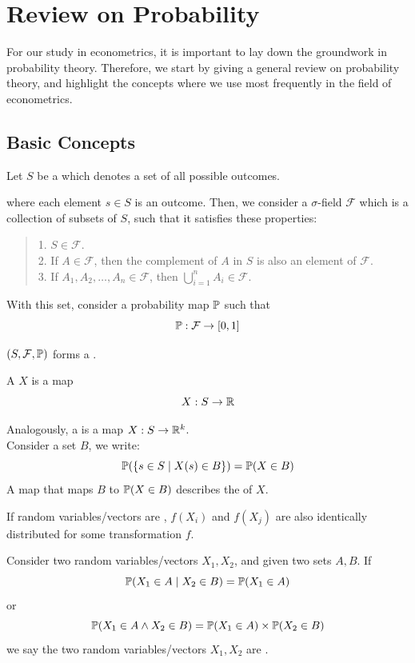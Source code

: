 \section{Review on Probability}
For our study in econometrics, it is important to lay down the groundwork in probability theory. Therefore, we start by giving a general review on probability theory, and highlight the concepts where we use most frequently in the field of econometrics.

\subsection{Basic Concepts}
\begin{definition}
    Let $S$ be a  which denotes a set of all possible outcomes.
\end{definition}
where each element $s \in S$ is an outcome. Then, we consider a $\sigma$-field $\mathcal{F}$ which is a collection of subsets of $S$, such that it satisfies these properties:
\begin{quote}
    1. $S \in \mathcal{F}$. \\
    2. If $A \in \mathcal{F}$, then the complement of $A$ in $S$ is also an element of $\mathcal{F}$. \\
    3. If $A_1, A_2, \dots, A_n \in \mathcal{F}$, then $\bigcup_{i = 1}^n A_i \in \mathcal{F}$.
\end{quote}
With this set, consider a probability map $\mathbb{P}$ such that
$$\mathbb{P}: \mathcal{F} \to [0, 1]$$
\begin{definition}
    $(S, \mathcal{F}, \mathbb{P})$ forms a .
\end{definition}
\begin{definition}
    A  $X$ is a map
    $$X: S \to \mathbb{R}$$
\end{definition}
Analogously, a  is a map $X: S \to \mathbb{R}^k$. \\
Consider a set $B$, we write:
$$\mathbb{P}(\{s \in S \mid X(s) \in B\}) = \mathbb{P}(X \in B)$$
A map that maps $B$ to $\mathbb{P}(X \in B)$ describes the  of $X$.
\begin{proposition}
    If random variables/vectors are , $f(X_i)$ and $f(X_j)$ are also identically distributed for some transformation $f$.
\end{proposition}
\begin{definition}
    Consider two random variables/vectors $X_1, X_2$, and given two sets $A, B$. If
    $$\mathbb{P}(X_1 \in A \mid X_2 \in B) = \mathbb{P}(X_1 \in A)$$
    or
    $$\mathbb{P}(X_1 \in A \land X_2 \in B) = \mathbb{P}(X_1 \in A) \times \mathbb{P}(X_2 \in B)$$
    we say the two random variables/vectors $X_1, X_2$ are .
\end{definition}
